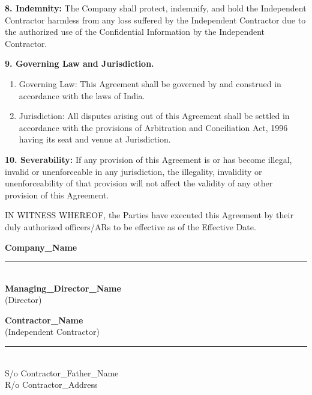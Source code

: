 \documentclass[12pt]{article}
\begin{document}
\vspace{0.5em}
\noindent
\textbf{8. Indemnity:} The Company shall protect, indemnify, and hold the Independent Contractor harmless from any loss suffered by the Independent Contractor due to the authorized use of the Confidential Information by the Independent Contractor.

\vspace{0.5em}
\noindent
\textbf{9. Governing Law and Jurisdiction.}
\begin{enumerate}
    \item[i.] Governing Law: This Agreement shall be governed by and construed in accordance with the laws of India.
    \item[ii.] Jurisdiction: All disputes arising out of this Agreement shall be settled in accordance with the provisions of Arbitration and Conciliation Act, 1996 having its seat and venue at {{Jurisdiction}}.
\end{enumerate}

\vspace{0.5em}
\noindent
\textbf{10. Severability:} If any provision of this Agreement is or has become illegal, invalid or unenforceable in any jurisdiction, the illegality, invalidity or unenforceability of that provision will not affect the validity of any other provision of this Agreement.

\vspace{2em}
\noindent
IN WITNESS WHEREOF, the Parties have executed this Agreement by their duly authorized officers/ARs to be effective as of the Effective Date.

\vspace{3em}
\noindent
\begin{minipage}[t]{0.45\textwidth}
    \textbf{{{Company_Name}}}\\[3em]
    \rule{4cm}{0.4pt}\\[0.5em]
    \textbf{{{Managing_Director_Name}}}\\
    (Director)
\end{minipage}
\hfill
\begin{minipage}[t]{0.45\textwidth}
    \textbf{{{Contractor_Name}}}\\
    (Independent Contractor)\\[3em]
    \rule{4cm}{0.4pt}\\[0.5em]
    S/o {{Contractor_Father_Name}}\\
    R/o {{Contractor_Address}}
\end{minipage}
\end{document}
